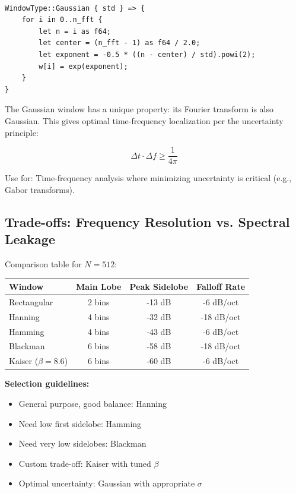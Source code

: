 \begin{lstlisting}[caption={Gaussian window implementation}]

WindowType::Gaussian { std } => {
    for i in 0..n_fft {
        let n = i as f64;
        let center = (n_fft - 1) as f64 / 2.0;
        let exponent = -0.5 * ((n - center) / std).powi(2);
        w[i] = exp(exponent);
    }
}
\end{lstlisting}

The Gaussian window has a unique property: its Fourier transform is
also Gaussian. This gives optimal time-frequency localization per the
uncertainty principle:

\begin{equation}
  \Delta t \cdot \Delta f \geq \frac{1}{4\pi}
\end{equation}

Use for: Time-frequency analysis where minimizing uncertainty is
critical (e.g., Gabor transforms).

\subsection{Trade-offs: Frequency Resolution vs. Spectral Leakage}

Comparison table for $N=512$:

\begin{center}
  \begin{tabular}{lccc}
    \textbf{Window} & \textbf{Main Lobe} & \textbf{Peak Sidelobe} &
    \textbf{Falloff Rate} \\
    \hline
    Rectangular & 2 bins & -13 dB & -6 dB/oct \\
    Hanning & 4 bins & -32 dB & -18 dB/oct \\
    Hamming & 4 bins & -43 dB & -6 dB/oct \\
    Blackman & 6 bins & -58 dB & -18 dB/oct \\
    Kaiser ($\beta=8.6$) & 6 bins & -60 dB & -6 dB/oct \\
  \end{tabular}
\end{center}

\textbf{Selection guidelines:}
\begin{itemize}
  \item General purpose, good balance: Hanning
  \item Need low first sidelobe: Hamming
  \item Need very low sidelobes: Blackman
  \item Custom trade-off: Kaiser with tuned $\beta$
  \item Optimal uncertainty: Gaussian with appropriate $\sigma$

\end{itemize}

